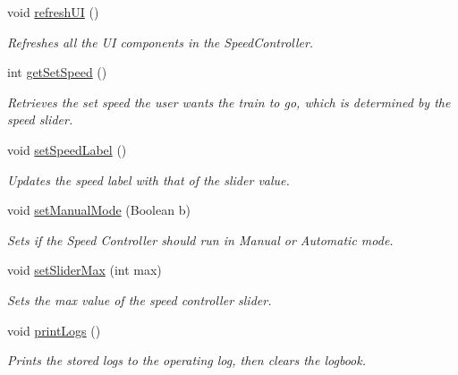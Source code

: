 \begin{DoxyCompactItemize}
void \hyperlink{classTrainControllerComps_1_1TCSpeedController_a037818d87276a705484f59c19cdbfa6f}{refresh\+UI} ()
\begin{DoxyCompactList}\small\item\em Refreshes all the UI components in the Speed\+Controller. \end{DoxyCompactList}\item 
int \hyperlink{classTrainControllerComps_1_1TCSpeedController_a46ca9df1d707cecd4167a532babcf6ed}{get\+Set\+Speed} ()
\begin{DoxyCompactList}\small\item\em Retrieves the set speed the user wants the train to go, which is determined by the speed slider. \end{DoxyCompactList}\item 
void \hyperlink{classTrainControllerComps_1_1TCSpeedController_afef25cbf49579c1ac17414ba29b30c13}{set\+Speed\+Label} ()
\begin{DoxyCompactList}\small\item\em Updates the speed label with that of the slider value. \end{DoxyCompactList}\item 
void \hyperlink{classTrainControllerComps_1_1TCSpeedController_a029c45976f5b311e30f90562acecbf8e}{set\+Manual\+Mode} (Boolean b)
\begin{DoxyCompactList}\small\item\em Sets if the Speed Controller should run in Manual or Automatic mode. \end{DoxyCompactList}\item 
void \hyperlink{classTrainControllerComps_1_1TCSpeedController_a1373bc000dd8c13b47d9a298c383dd7e}{set\+Slider\+Max} (int max)
\begin{DoxyCompactList}\small\item\em Sets the max value of the speed controller slider. \end{DoxyCompactList}\item 
void \hyperlink{classTrainControllerComps_1_1TCSpeedController_a0aff8debe964e2c66d38a065052bbb2a}{print\+Logs} ()
\begin{DoxyCompactList}\small\item\em Prints the stored logs to the operating log, then clears the logbook. \end{DoxyCompactList}\end{DoxyCompactItemize}
